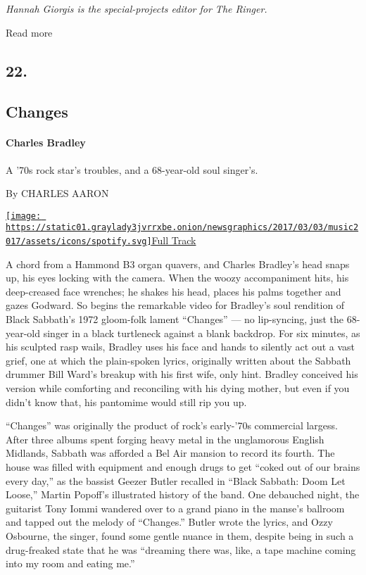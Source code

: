 \emph{Hannah Giorgis is the special-projects editor for The Ringer.}

Read more

\hypertarget{22}{%
\subsection{22.}\label{22}}

\hypertarget{--changes}{%
\subsection{\texorpdfstring{ Changes}{  Changes}}\label{--changes}}

\hypertarget{charles-bradley}{%
\paragraph{Charles Bradley}\label{charles-bradley}}

A '70s rock star's troubles, and a 68-year-old soul singer's.

By CHARLES AARON

\href{https://open.spotify.com/track/3i85UIF4nR7qZXTnEwqdPr}{\texttt{[image: https://static01.graylady3jvrrxbe.onion/newsgraphics/2017/03/03/music2017/assets/icons/spotify.svg]}Full
Track}

A chord from a Hammond B3 organ quavers, and Charles Bradley's head
snaps up, his eyes locking with the camera. When the woozy accompaniment
hits, his deep-creased face wrenches; he shakes his head, places his
palms together and gazes Godward. So begins the remarkable video for
Bradley's soul rendition of Black Sabbath's 1972 gloom-folk lament
``Changes'' --- no lip-syncing, just the 68-year-old singer in a black
turtleneck against a blank backdrop. For six minutes, as his sculpted
rasp wails, Bradley uses his face and hands to silently act out a vast
grief, one at which the plain-spoken lyrics, originally written about
the Sabbath drummer Bill Ward's breakup with his first wife, only hint.
Bradley conceived his version while comforting and reconciling with his
dying mother, but even if you didn't know that, his pantomime would
still rip you up.

``Changes'' was originally the product of rock's early-'70s commercial
largess. After three albums spent forging heavy metal in the unglamorous
English Midlands, Sabbath was afforded a Bel Air mansion to record its
fourth. The house was filled with equipment and enough drugs to get
``coked out of our brains every day,'' as the bassist Geezer Butler
recalled in ``Black Sabbath: Doom Let Loose,'' Martin Popoff's
illustrated history of the band. One debauched night, the guitarist Tony
Iommi wandered over to a grand piano in the manse's ballroom and tapped
out the melody of ``Changes.'' Butler wrote the lyrics, and Ozzy
Osbourne, the singer, found some gentle nuance in them, despite being in
such a drug-freaked state that he was ``dreaming there was, like, a tape
machine coming into my room and eating me.''

